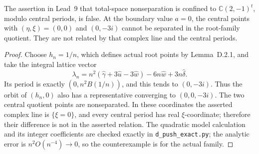 \begin{proposition}
The assertion in Lead~9 that total-space nonseparation is confined to
\(\mathbb C(2,-1)^t\), modulo central periods, is false. At the
boundary value \(a=0\), the central points with \((\eta,\xi)=(0,0)\)
and \((0,-3i)\) cannot be separated in the root-family quotient.
They are not related by that complex line and the central periods.
\end{proposition}
\begin{proof}
Choose \(h_n=1/n\), which defines actual root points by Lemma~D.2.1,
and take the integral lattice vector
\[
 \lambda_n=n^2(\widehat\gamma+3\widehat u-3\widehat w)
            -6n\widehat w+3n\widehat\delta.
\]
Its period is exactly \((0,n^2B(1/n))\), and this tends to
\((0,-3i)\). Thus the orbit of \((h_n,0)\) also has a representative
converging to \((0,0,-3i)\). The two central quotient points are
nonseparated. In these coordinates the asserted complex line is
\(\{\xi=0\}\), and every central period has real \(\xi\)-coordinate;
therefore their difference is not in the asserted relation. The
quadratic model calculation and its integer coefficients are checked
exactly in \texttt{d\_push\_exact.py}; the analytic error is
\(n^2O(n^{-4})\to0\), so the counterexample is for the actual family.
\end{proof}

